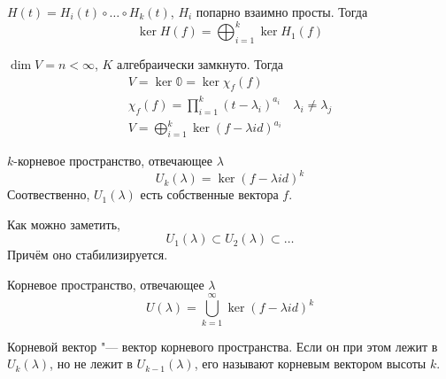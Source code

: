 \begin{conseq}
	$H(t) = H_i(t) \circ \dots \circ H_k(t)$, $H_i$ попарно взаимно просты.
	Тогда
	\[ \ker H(f) = \bigoplus_{i=1}^k \ker H_1(f) \]
\end{conseq}

$\dim V = n < \infty$, $K$ алгебраически замкнуто.
Тогда
\begin{gather*}
	V = \ker \mathbb{0} = \ker \chi_f(f) \\
	\chi_f(f) = \prod_{i=1}^k (t-\lambda_i)^{a_i} \quad \lambda_i \ne \lambda_j \\
	V = \bigoplus_{i=1}^k \ker (f - \lambda id)^{a_i}
\end{gather*}

\begin{Def}
	$k$-корневое пространство, отвечающее $\lambda$
	\[ U_k(\lambda) = \ker (f - \lambda id)^k \]
	Соотвественно, $U_1(\lambda)$ есть собственные вектора $f$.
\end{Def}

Как можно заметить,
\[ U_1(\lambda) \subset U_2(\lambda) \subset \dots \]
Причём оно стабилизируется.
\begin{Def}
	Корневое пространство, отвечающее $\lambda$
	\[ U(\lambda) = \bigcup_{k=1}^\infty \ker (f - \lambda id)^k \]
\end{Def}

\begin{Def}
	Корневой вектор "--- вектор корневого пространства.
	Если он при этом лежит в $U_{k}(\lambda)$, но не лежит в $U_{k-1}(\lambda)$, его называют корневым вектором высоты $k$.
\end{Def}
